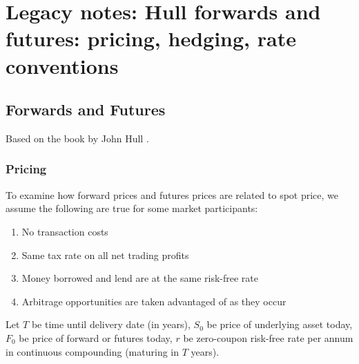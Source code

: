 \documentclass[a4paper,oneside,openany]{book}
\begin{document}
\chapter*{Legacy notes: Hull forwards and futures: pricing, hedging, rate conventions}

\section*{Forwards and Futures}

Based on the book by John Hull \citep{s7-hulloptions}.

\subsection{Pricing}

To examine how forward prices and futures prices are related to spot price, we assume the following are true for some market participants:
\begin{enumerate}[label=\roman*.]
\setlength{\itemsep}{0pt}
\item No transaction costs
\item Same tax rate on all net trading profits
\item Money borrowed and lend are at the same risk-free rate
\item Arbitrage opportunities are taken advantaged of as they occur
\end{enumerate}

Let $T$ be time until delivery date (in years), $S_0$ be price of underlying asset today, $F_0$ be price of forward or futures today, $r$ be zero-coupon risk-free rate per annum in continuous compounding (maturing in $T$ years).\\
\end{document}
